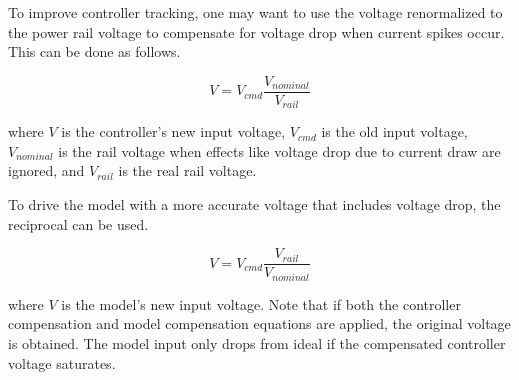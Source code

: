 To improve controller \gls{tracking}, one may want to use the voltage
renormalized to the power rail voltage to compensate for voltage drop when
current spikes occur. This can be done as follows.

\begin{equation}
  V = V_{cmd} \frac{V_{nominal}}{V_{rail}}
\end{equation}

where $V$ is the \gls{controller}'s new input voltage, $V_{cmd}$ is the old
input voltage, $V_{nominal}$ is the rail voltage when effects like voltage drop
due to current draw are ignored, and $V_{rail}$ is the real rail voltage.

To drive the \gls{model} with a more accurate voltage that includes voltage
drop, the reciprocal can be used.

\begin{equation}
  V = V_{cmd} \frac{V_{rail}}{V_{nominal}}
\end{equation}

where $V$ is the \gls{model}'s new input voltage. Note that if both the
\gls{controller} compensation and \gls{model} compensation equations are
applied, the original voltage is obtained. The \gls{model} input only drops from
ideal if the compensated \gls{controller} voltage saturates.
